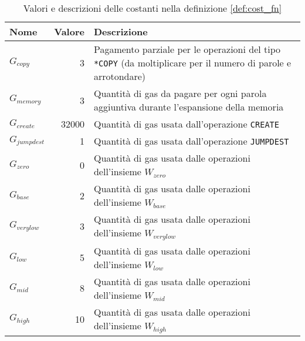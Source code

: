 \documentclass[12pt,a4paper,openright,oneside]{report}
\theoremstyle{definition}
\begin{document}
\begin{table}[h]
    \centering
    \begin{tabular}{|l|r|m{23em}|}
        \hline
        Nome & Valore & Descrizione \\
        \hline
        $G_{copy}$ & 3 & Pagamento parziale per le operazioni del tipo \texttt{*COPY} (da moltiplicare per il numero di parole e arrotondare) \\
        \hline
        $G_{memory}$ & 3 & Quantit\`{a} di gas da pagare per ogni parola aggiuntiva durante l'espansione della memoria \\
        \hline
        $G_{create}$ & 32000 & Quantit\`{a} di gas usata dall'operazione \texttt{CREATE} \\
        \hline
        $G_{jumpdest}$ & 1 & Quantit\`{a} di gas usata dall'operazione \texttt{JUMPDEST} \\
        \hline
        $G_{zero}$ & 0 & Quantit\`{a} di gas usata dalle operazioni dell'insieme $W_{zero}$ \\
        \hline
        $G_{base}$ & 2 & Quantit\`{a} di gas usata dalle operazioni dell'insieme $W_{base}$ \\
        \hline
        $G_{verylow}$ & 3 & Quantit\`{a} di gas usata dalle operazioni dell'insieme $W_{verylow}$ \\
        \hline
        $G_{low}$ & 5 & Quantit\`{a} di gas usata dalle operazioni dell'insieme $W_{low}$ \\
        \hline
        $G_{mid}$ & 8 &  Quantit\`{a} di gas usata dalle operazioni dell'insieme $W_{mid}$ \\
        \hline
        $G_{high}$ & 10 & Quantit\`{a} di gas usata dalle operazioni dell'insieme $W_{high}$ \\
        \hline
    \end{tabular}
    \caption{Valori e descrizioni delle costanti nella definizione \ref{def:cost_fn}}
    \label{table:impl:costs_calculation:intrinsic_gas_constants}
\end{table}
\end{document}

